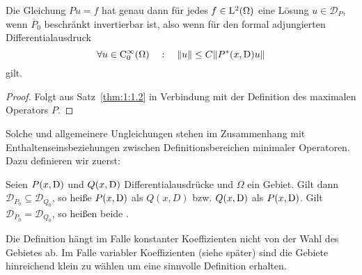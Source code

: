 \begin{thm}\label{thm:1:loesbarkeit}
Die Gleichung $Pu=f$ hat genau dann für jedes $f\in\mathrm L^2(\Omega)$ eine L\"osung $u\in\mathcal D_{P}$, wenn $\overline  P_0$ beschränkt invertierbar ist, also wenn f\"ur den formal adjungierten Differentialausdruck
\begin{equation}
  \forall u\in\mathrm C^\infty_0(\Omega)\quad:\quad   \|u\| \le C \|   P^*(x,\mathrm D) u \|
\end{equation}
gilt.
\end{thm}
\begin{proof}
Folgt aus Satz~\ref{thm:1:1.2} in Verbindung mit der Definition des maximalen Operators $P$.
\end{proof}

Solche und allgemeinere Ungleichungen stehen im Zusammenhang mit Enthaltenseinsbeziehungen zwischen Definitionsbereichen minimaler Operatoren. Dazu definieren wir zuerst: 
\begin{df}\label{df:1:1.2}
Seien $P(x,\mathrm D)$ und $Q(x,\mathrm D)$ Differentialausdrücke und $\Omega$ ein Gebiet. Gilt dann $\mathcal D_{P_0}\subseteq \mathcal D_{Q_0}$, so heiße $P(x,\mathrm D)$  als $Q(x,D)$ bzw. $Q(x,\mathrm D)$  als $P(x,\mathrm D)$. Gilt $\mathcal D_{P_0}=\mathcal D_{Q_0}$, so heißen beide .
\end{df}
Die  Definition hängt im Falle konstanter Koeffizienten nicht von der Wahl des Gebietes ab. Im Falle variabler Koeffizienten (siehe später) sind die Gebiete hinreichend klein zu wählen um eine sinnvolle Definition erhalten.

